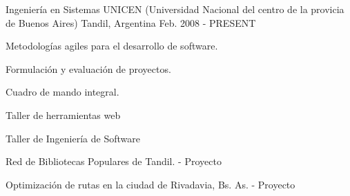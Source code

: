 


\begin{cventries}


\cventry
{Ingeniería en Sistemas} %
{UNICEN (Universidad Nacional del centro de la provicia de Buenos Aires)} %
{Tandil, Argentina} %
{Feb. 2008 - PRESENT} %
{ %
\begin{cvitems}
\item {Metodologías agiles para el desarrollo de software.}
\item {Formulación y evaluación de proyectos.}
\item {Cuadro de mando integral.}
\item {Taller de herramientas web}
\item {Taller de Ingeniería de Software}
\item {Red de Bibliotecas Populares de Tandil. - Proyecto}
\item {Optimización de rutas en la ciudad de Rivadavia, Bs. As. - Proyecto}
\end{cvitems}
}


\end{cventries}

